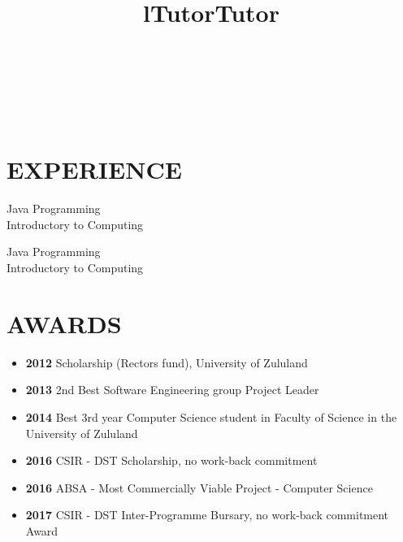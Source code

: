 \documentclass[margin]{res}
\begin{document}
\begin{resume}

\begin{format}
\title{l}\\
\\
\body\\
\end{format}

\section{EXPERIENCE}
\title{\textbf{Tutor}}
\begin{position}
Java Programming\\
Introductory to Computing
\end{position}

\title{\textbf{Tutor}}
\begin{position}
Java Programming\\ 
Introductory to Computing
\end{position}

\section{AWARDS}
\begin{itemize}
\item \textbf{2012} Scholarship (Rector\textsc{}s fund), University of Zululand  
\item \textbf{2013} 2nd Best Software Engineering group Project Leader 
\item \textbf{2014} Best 3rd year Computer Science student in Faculty of Science in the University of 
Zululand
\item \textbf{2016} CSIR - DST Scholarship, no work-back commitment
\item \textbf{2016} ABSA - Most Commercially Viable Project - Computer Science
\item \textbf{2017} CSIR - DST Inter-Programme Bursary, no work-back commitment Award
\end{itemize}


\end{resume}
\end{document}
